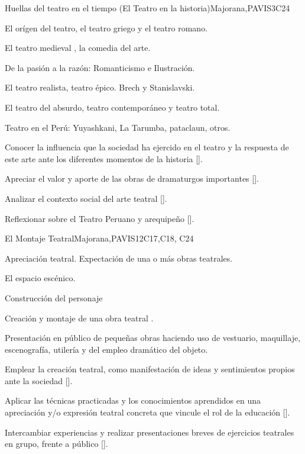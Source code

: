 \begin{syllabus}
\begin{unit}{}{Huellas del teatro en el tiempo  (El Teatro en la historia)}{Majorana,PAVIS}{3}{C24}
\begin{topics}
	\item El orígen del teatro, el teatro griego y el teatro romano.
	\item El teatro medieval , la comedia del arte.
	\item De la pasión a la razón: Romanticismo e Ilustración.
	\item El teatro realista, teatro épico. Brech  y  Stanislavski.
	\item El teatro del absurdo, teatro contemporáneo y teatro total.
	\item Teatro en el Perú: Yuyashkani, La Tarumba, pataclaun, otros.
\end{topics}
\begin{learningoutcomes}
	\item Conocer la influencia que la sociedad ha ejercido en el teatro y la respuesta de este arte ante los diferentes momentos de la historia [\Usage].
	\item Apreciar el valor y aporte de las obras de dramaturgos importantes [\Usage].
	\item Analizar el contexto social del arte teatral [\Usage].
	\item Reflexionar sobre el Teatro Peruano y arequipeño [\Usage].
\end{learningoutcomes}
\end{unit}

\begin{unit}{}{El  Montaje Teatral}{Majorana,PAVIS}{12}{C17,C18, C24}
\begin{topics}
	\item Apreciación teatral. Expectación de una o más obras teatrales.
	\item El espacio escénico.
	\item Construcción del personaje
	\item Creación y montaje de una obra teatral .
	\item Presentación en público de pequeñas obras haciendo uso de vestuario, maquillaje, escenografía, utilería y del empleo dramático del objeto.
\end{topics}
\begin{learningoutcomes}
	\item Emplear  la creación teatral, como manifestación de ideas y sentimientos propios ante la sociedad [\Usage].
	\item Aplicar las técnicas practicadas y los conocimientos aprendidos en una apreciación y/o expresión teatral concreta que vincule el rol de la educación [\Usage].
	\item Intercambiar experiencias y realizar presentaciones breves de ejercicios teatrales en grupo, frente a público [\Usage].
\end{learningoutcomes}
\end{unit}



\begin{coursebibliography}
\end{coursebibliography}

\end{syllabus}
